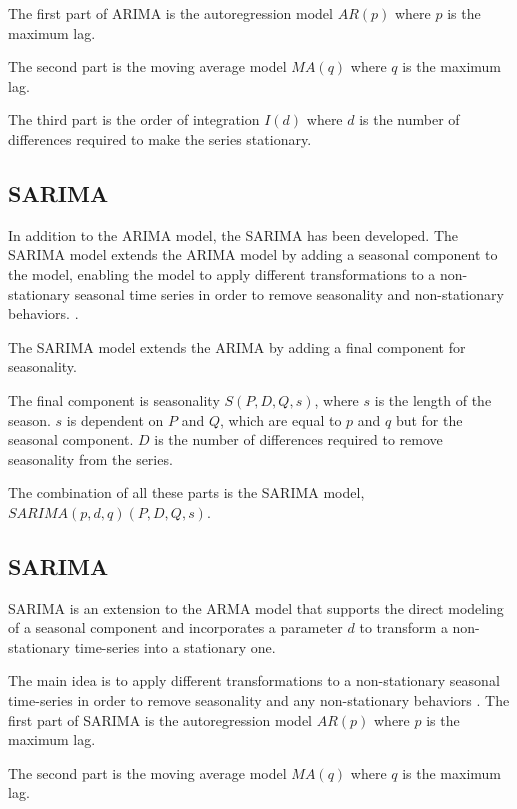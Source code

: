 The first part of ARIMA is the autoregression model
$AR(p)$ where $p$ is the maximum lag.

The second part is the moving average model $MA(q)$ where $q$ is the maximum lag.

The third part is the order of integration $I(d)$ where $d$ is the number of
differences required to make the series stationary.


\subsection{SARIMA}
In addition to the ARIMA model, the SARIMA has been developed.
The SARIMA model extends the ARIMA model by adding a seasonal component to the model,
enabling the model to apply different transformations to a non-stationary seasonal time series in order to remove seasonality and non-stationary behaviors.
\citep[p. 327-385]{Utlaut2008}.

The SARIMA model extends the ARIMA by adding a final component for seasonality.

The final component is seasonality $S(P, D, Q, s)$, where $s$ is the length
of the season.
$s$ is dependent on $P$ and $Q$, which are equal to $p$ and $q$ but for the seasonal component.
$D$ is the number of differences required to remove seasonality from the series.

The combination of all these parts is the SARIMA model,
$SARIMA(p, d, q)(P, D, Q, s)$.




\iffalse
  \subsection{SARIMA}
  SARIMA is an extension to the ARMA model that supports the direct modeling of a seasonal component and incorporates a parameter $d$
  to transform a non-stationary time-series into a stationary one.

  The main idea is to apply different transformations to a non-stationary seasonal time-series
  in order to remove seasonality and any non-stationary behaviors
  \citep[p. 327-385]{Utlaut2008}.
  The first part of SARIMA is the autoregression model
  $AR(p)$ where $p$ is the maximum lag.

  The second part is the moving average model $MA(q)$ where $q$ is the maximum lag.

